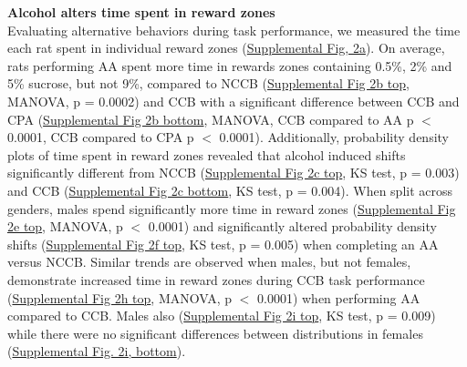 \documentclass{article}
\begin{document}
\vspace{1em}

\noindent\textbf{Alcohol alters time spent in reward zones}\\
Evaluating alternative behaviors during task performance, we measured the time each rat spent in individual reward zones (\hyperref[fig:Alcohol_SI_2]{Supplemental Fig, 2a}). On average, rats performing AA spent more time in rewards zones containing 0.5\%, 2\% and 5\% sucrose, but not 9\%, compared to NCCB (\hyperref[fig:Alcohol_SI_2]{Supplemental Fig 2b top}, MANOVA, p = 0.0002) and CCB with a significant difference between CCB and CPA (\hyperref[fig:Alcohol_SI_2]{Supplemental Fig 2b bottom}, MANOVA, CCB compared to AA p $<$ 0.0001, CCB compared to CPA p $<$ 0.0001). Additionally, probability density plots of time spent in reward zones revealed that alcohol induced shifts significantly different from NCCB (\hyperref[fig:Alcohol_SI_2]{Supplemental Fig 2c top}, KS test, p = 0.003) and CCB (\hyperref[fig:Alcohol_SI_2]{Supplemental Fig 2c bottom}, KS test, p = 0.004). When split across genders, males spend significantly more time in reward zones (\hyperref[fig:Alcohol_SI_2]{Supplemental Fig 2e top}, MANOVA, p $<$ 0.0001) and significantly altered probability density shifts (\hyperref[fig:Alcohol_SI_2]{Supplemental Fig 2f top}, KS test, p = 0.005) when completing an AA versus NCCB. Similar trends are observed when males, but not females, demonstrate increased time in reward zones during CCB task performance (\hyperref[fig:Alcohol_SI_2]{Supplemental Fig 2h top}, MANOVA, p $<$ 0.0001) when performing AA compared to CCB. Males also (\hyperref[fig:Alcohol_SI_2]{Supplemental Fig 2i top}, KS test, p = 0.009) while there were no significant differences between distributions in females (\hyperref[fig:Alcohol_SI_2]{Supplemental Fig. 2i, bottom}).

\vspace{1em}
\end{document}
